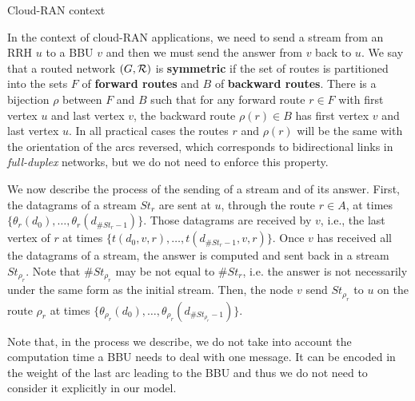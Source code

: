 \documentclass[10pt]{article}
\begin{document}
      \begin{subsection}{Cloud-RAN context}
     
      In the context of cloud-RAN applications, we need to send a stream from an RRH $u$ to a BBU $v$ and then 
      we must send the answer from $v$ back to $u$. We say that a routed network $(G, {\cal R})$ is \textbf{symmetric} if the set of routes is partitioned into the sets $F$ of \textbf{forward routes} and $B$ of \textbf{backward routes}. There is a bijection $\rho$ between $F$ and $B$ such that for any forward route $r \in F$ with first vertex $u$ and last vertex $v$, the backward route $\rho(r) \in B$ has first vertex $v$ and last vertex $u$. In all practical cases the routes $r$ and $\rho(r)$ will be the same with the orientation of the arcs reversed, which corresponds to bidirectional links in \emph{full-duplex} networks, but we do not need to enforce this property.
      
     We now describe the process of the sending of a stream and of its answer. First, the datagrams of a stream $St_r$ are sent at $u$, through the route $r \in A$, at times $\{\theta_r(d_0),\ldots,\theta_r(d_{\#St_r-1}) \}$.
      Those datagrams are received by $v$, i.e., the last vertex of $r$ at times $\{t(d_0,v,r),\ldots,t(d_{\#St_r-1},v,r)\}$. 
     Once $v$ has received all the datagrams of a stream, the answer is computed and sent back in a stream $St_{\rho_r}$. Note that $\#St_{\rho_r}$ may be not equal to $\#St_r$, i.e. the answer is not necessarily under the same form as the initial stream. Then, the node $v$ send $St_{\rho_r}$ to  $u$ on the route $\rho_r$ at times $\{\theta_{\rho_r}(d_0),\ldots,\theta_{\rho_r}(d_{\#St_{\rho_r}-1}) \}$.
     

     Note that, in the process we describe, we do not take into account the computation time a BBU needs to deal with one message. It can be encoded in the weight of the last arc leading to the BBU and thus we do not need to consider it explicitly in our model. 

     \end{subsection}
\end{document}
